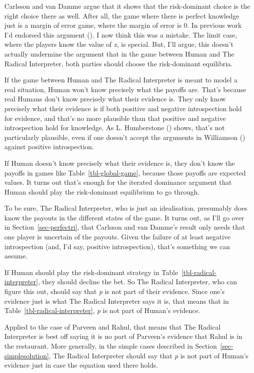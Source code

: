 \documentclass[
  10pt,
  letterpaper,
  twoside]{scrbook}
\begin{document}
Carlsson and van Damme argue that it shows that the risk-dominant choice
is the right choice there as well. After all, the game where there is
perfect knowledge just is a margin of error game, where the margin of
error is 0. In previous work I'd endorsed this argument
(). I now think
this was a mistake. The limit case, where the players know the value of
\emph{x}, is special. But, I'll argue, this doesn't actually undermine
the argument that in the game between Human and The Radical Interpreter,
both parties should choose the risk-dominant equilibria.

If the game between Human and The Radical Interpreter is meant to model
a real situation, Human won't know precisely what the payoffs are.
That's because real Humans don't know precisely what their evidence is.
They only know precisely what their evidence is if both positive and
negative introspection hold for evidence, and that's no more plausible
than that positive and negative introspection hold for knowledge. As L.
Humberstone () shows,
that's not particularly plausible, even if one doesn't accept the
arguments in Williamson () against
positive introspection.

If Human doesn't know precisely what their evidence is, they don't know
the payoffs in games like Table~\ref{tbl-global-game}, because those
payoffs are expected values. It turns out that's enough for the iterated
dominance argument that Human should play the risk-dominant equilibrium
to go through.

To be sure, The Radical Interpreter, who is just an idealisation,
presumably does know the payouts in the different states of the game. It
turns out, as I'll go over in Section~\ref{sec-perfectri}, that Carlsson
and van Damme's result only needs that one player is uncertain of the
payouts. Given the failure of at least negative introspection (and, I'd
say, positive introspection), that's something we can assume.

If Human should play the risk-dominant strategy in
Table~\ref{tbl-radical-interpreter}, they should decline the bet. So The
Radical Interpreter, who can figure this out, should say that \emph{p}
is not part of their evidence. Since one's evidence just is what The
Radical Interpreter says it is, that means that in
Table~\ref{tbl-radical-interpreter}, \emph{p} is not part of Human's
evidence.

Applied to the case of Parveen and Rahul, that means that The Radical
Interpreter is best off saying it is no part of Parveen's evidence that
Rahul is in the restaurant. More generally, in the simple cases
described in Section~\ref{sec-simplesolution}, The Radical Interpreter
should say that \emph{p} is not part of Human's evidence just in case
the equation used there holds.
\end{document}
